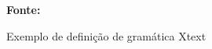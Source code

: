 \begin{figure}[h!]
\centering

\caption{\textmd{Exemplo de definição de gramática Xtext}}
\label{fig:xtextgramatica}

\par\medskip\textbf{Fonte:} \cite{xtextsite} \par\medskip
\end{figure}
